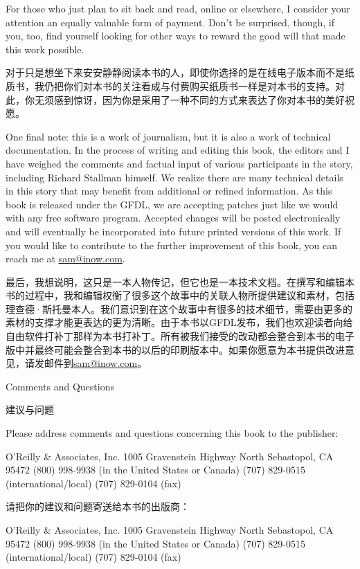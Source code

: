 \ifdefined\eng
For those who just plan to sit back and read, online or elsewhere, I consider your attention an equally valuable form of payment. Don't be surprised, though, if you, too, find yourself looking for other ways to reward the good will that made this work possible.
\fi

\ifdefined\chs
对于只是想坐下来安安静静阅读本书的人，即使你选择的是在线电子版本而不是纸质书，我仍把你们对本书的关注看成与付费购买纸质书一样是对本书的支持。对此，你无须感到惊讶，因为你是采用了一种不同的方式来表达了你对本书的美好祝愿。
\fi

\ifdefined\eng
One final note: this is a work of journalism, but it is also a work of technical documentation. In the process of writing and editing this book, the editors and I have weighed the comments and factual input of various participants in the story, including Richard Stallman himself. We realize there are many technical details in this story that may benefit from additional or refined information. As this book is released under the GFDL, we are accepting patches just like we would with any free software program. Accepted changes will be posted electronically and will eventually be incorporated into future printed versions of this work. If you would like to contribute to the further improvement of this book, you can reach me at \url{sam@inow.com}.
\fi

\ifdefined\chs
最后，我想说明，这只是一本人物传记，但它也是一本技术文档。在撰写和编辑本书的过程中，我和编辑权衡了很多这个故事中的关联人物所提供建议和素材，包括理查德·斯托曼本人。我们意识到在这个故事中有很多的技术细节，需要由更多的素材的支撑才能更表达的更为清晰。由于本书以GFDL发布，我们也欢迎读者向给自由软件打补丁那样为本书打补丁。所有被我们接受的改动都会整合到本书的电子版中并最终可能会整合到本书的以后的印刷版本中。如果你愿意为本书提供改进意见，请发邮件到\url{sam@inow.com}。
\fi

\ifdefined\eng
Comments and Questions
\fi

\ifdefined\chs
建议与问题
\fi

\ifdefined\eng
Please address comments and questions concerning this book to the publisher:

O'Reilly \& Associates, Inc. 
1005 Gravenstein Highway North 
Sebastopol, CA 95472 
(800) 998-9938 (in the United States or Canada) 
(707) 829-0515 (international/local) 
(707) 829-0104 (fax)
\fi

\ifdefined\chs
请把你的建议和问题寄送给本书的出版商：

O'Reilly \& Associates, Inc. 
1005 Gravenstein Highway North 
Sebastopol, CA 95472 
(800) 998-9938 (in the United States or Canada) 
(707) 829-0515 (international/local) 
(707) 829-0104 (fax)
\fi

